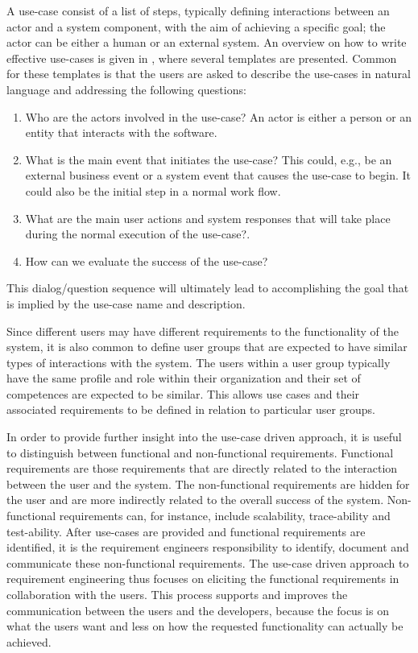 A use-case consist of a list of steps, typically defining interactions between an actor and a system component, with the aim of
achieving a specific  goal; the actor can be either a human or an external system.  An overview on how to write
effective use-cases is given in \cite{Coc01}, where several templates are presented. Common for these templates is that
the users are asked to describe the use-cases in natural language and addressing the following questions:
\begin{enumerate}[itemsep=2pt,parsep=2pt,topsep=4pt, partopsep=4pt]
\item Who are the actors involved in the use-case? An actor is either a person or an entity that interacts with the software.  
\item What is the main event that initiates the use-case? This could, e.g., be an external business event or a system event that causes the use-case to begin.  It could also be the initial step in a normal work flow. 
\item What are the main user actions and system responses that will take place during the normal execution of the use-case?. 
\item How can we evaluate the success of the use-case?
\end{enumerate}
This dialog/question sequence will ultimately lead to accomplishing the goal that is implied by the use-case name and description.

Since different users may have different requirements to the functionality of the system, it is also common to define
user groups that are expected to have similar types of interactions with the system. The users
within a user group typically have the same profile and role within their organization and their set of competences are expected to
be similar. This allows use cases and their associated requirements to be defined in relation to particular user groups.

In order to provide further insight into the use-case driven approach, it is useful to distinguish between functional and non-functional
requirements.  Functional requirements are those requirements that are directly related to the interaction between the
user and the system.  The non-functional requirements are hidden for the user and are more indirectly related to the  overall
success of the system.  Non-functional requirements can, for instance, include scalability, trace-ability and test-ability.  After use-cases are provided and functional
requirements are identified, it is the requirement engineers responsibility to identify, document and communicate these
non-functional requirements.  The use-case driven approach to requirement engineering thus focuses on eliciting the
functional requirements in collaboration with the users.  This process supports and improves the communication between the users and the developers,
because the focus is on what the users want and less on how the requested functionality can actually be achieved.
